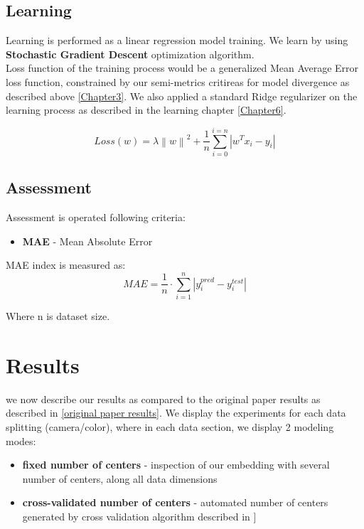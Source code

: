 \subsection{Learning}
Learning is performed as a linear regression model training.
We learn by using \textbf{Stochastic Gradient Descent} \cite{SGD} optimization algorithm. \\
Loss function of the training process would be a generalized Mean Average Error \cite{MAE} loss function, constrained by our semi-metrics critireas for model divergence as described above \ref{Chapter3}.
We also applied a standard Ridge \cite{Ridge} regularizer on the learning process as described in the learning chapter \ref{Chapter6}.
\cite{retargeting} \cite{einstein}
\newcommand\norm[1]{\left\lVert#1\right\rVert}

\begin{equation}
	Loss(w)=\lambda\norm{w}^2 + \frac{1}{n}\sum_{i=0}^{i=n} |w^T x_i - y_i|
\end{equation}

\subsection{Assessment}
Assessment is operated following criteria:
\begin{itemize}
\item \textbf{MAE} - Mean Absolute Error
\end{itemize}

MAE index is measured as:
\begin{equation}
MAE = \frac{1}{n} \cdot \sum_{i = 1}^{n}{|y^{pred}_i - y^{test}_i|}
\end{equation}

Where n is dataset size. \\


\section{Results}

we now describe our results as compared to the original paper results as described in \ref{original paper results}.
We display the experiments for each data splitting (camera/color), where in each data section, we display 2 modeling modes:
\begin{itemize}
	\item \textbf{fixed number of centers} - inspection of our embedding with several number of centers, along all data dimensions
	\item \textbf{cross-validated number of centers} - automated number of centers generated by cross validation algorithm described in {]}
\end{itemize}



